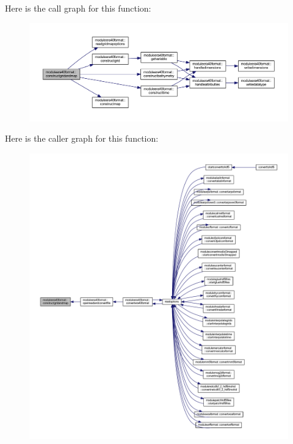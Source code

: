Here is the call graph for this function\+:\nopagebreak
\begin{figure}[H]
\begin{center}
\leavevmode
\includegraphics[width=350pt]{namespacemoduleera40format_ad4271c51cd4bfc71c5ed5743a60e7fef_cgraph}
\end{center}
\end{figure}
Here is the caller graph for this function\+:\nopagebreak
\begin{figure}[H]
\begin{center}
\leavevmode
\includegraphics[width=350pt]{namespacemoduleera40format_ad4271c51cd4bfc71c5ed5743a60e7fef_icgraph}
\end{center}
\end{figure}
\mbox{\label{namespacemoduleera40format_afe5dcd73c50804212a7b39e48bf7d428}} 
